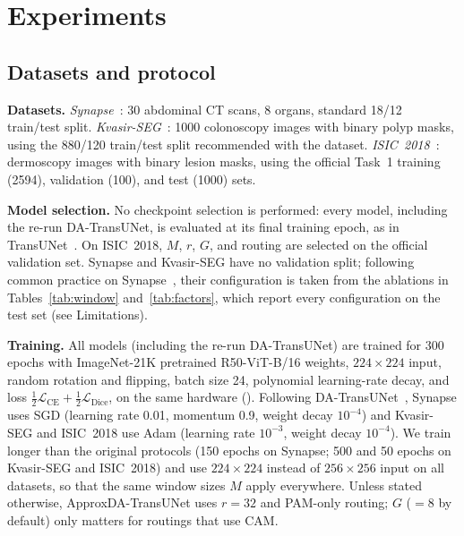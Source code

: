 \section{Experiments}
\label{sec:experiments}

\subsection{Datasets and protocol}
\label{ssec:protocol}

\textbf{Datasets.} \emph{Synapse}~\cite{landman2015miccai}: 30 abdominal CT scans, 8 organs, standard 18/12 train/test split. \emph{Kvasir-SEG}~\cite{jha2020kvasir}: 1000 colonoscopy images with binary polyp masks, using the 880/120 train/test split recommended with the dataset. \emph{ISIC~2018}~\cite{codella2019isic}: dermoscopy images with binary lesion masks, using the official Task~1 training (2594), validation (100), and test (1000) sets.

\textbf{Model selection.} No checkpoint selection is performed: every model, including the re-run DA-TransUNet, is evaluated at its final training epoch, as in TransUNet~\cite{chen2021transunet}. On ISIC~2018, $M$, $r$, $G$, and routing are selected on the official validation set. Synapse and Kvasir-SEG have no validation split; following common practice on Synapse~\cite{chen2021transunet,sun2024datransunet}, their configuration is taken from the ablations in Tables~\ref{tab:window} and~\ref{tab:factors}, which report every configuration on the test set (see Limitations).

\textbf{Training.} All models (including the re-run DA-Trans\-UNet) are trained for 300 epochs with ImageNet-21K pretrained R50-ViT-B/16 weights, $224{\times}224$ input, random rotation and flipping, batch size 24, polynomial learning-rate decay, and loss $\tfrac12\mathcal{L}_{\mathrm{CE}}+\tfrac12\mathcal{L}_{\mathrm{Dice}}$, on the same hardware (). Following DA-TransUNet~\cite{sun2024datransunet}, Synapse uses SGD (learning rate 0.01, momentum 0.9, weight decay $10^{-4}$) and Kvasir-SEG and ISIC~2018 use Adam (learning rate $10^{-3}$, weight decay $10^{-4}$). We train longer than the original protocols (150 epochs on Synapse; 500 and 50 epochs on Kvasir-SEG and ISIC~2018) and use $224{\times}224$ instead of $256{\times}256$ input on all datasets, so that the same window sizes $M$ apply everywhere. Unless stated otherwise, ApproxDA-TransUNet uses $r{=}32$ and PAM-only routing; $G$ ($=8$ by default) only matters for routings that use CAM.

